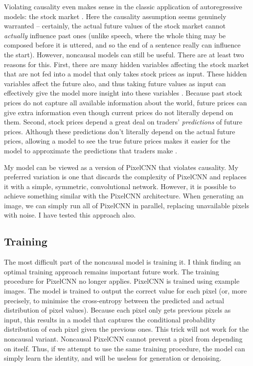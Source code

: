 \documentclass[10pt,a4paper]{article}
\begin{document}
Violating causality even makes sense in the classic application of autoregressive models: the stock market \citep{noncausaleco1}. Here the causality assumption seems genuinely warranted -- certainly, the actual future values of the stock market cannot \emph{actually} influence past ones (unlike speech, where the whole thing may be composed before it is uttered, and so the end of a sentence really can influence the start). However, noncausal models can still be useful. There are at least two reasons for this. First, there are many hidden variables affecting the stock market that are not fed into a model that only takes stock prices as input. These hidden variables affect the future also, and thus taking future values as input can effectively give the model more insight into these variables \citep{noncausaleco1}. Because past stock prices do not capture all available information about the world, future prices can give extra information even though current prices do not literally depend on them. Second, stock prices depend a great deal on traders' \emph{predictions} of future prices. Although these predictions don't literally depend on the actual future prices, allowing a model to see the true future prices makes it easier for the model to approximate the predictions that traders make \citep{noncausaleco1}.

My model can be viewed as a version of PixelCNN that violates causality. My preferred variation is one that discards the complexity of PixelCNN and replaces it with a simple, symmetric, convolutional network. However, it is possible to achieve something similar with the PixelCNN architecture. When generating an image, we can simply run all of PixelCNN in parallel, replacing unavailable pixels with noise. I have tested this approach also.

\subsection{Training}

The most difficult part of the noncausal model is training it. I think finding an optimal training approach remains important future work. The training procedure for PixelCNN no longer applies. PixelCNN is trained using example images. The model is trained to output the correct value for each pixel (or, more precisely, to minimise the cross-entropy between the predicted and actual distribution of pixel values). Because each pixel only gets previous pixels as input, this results in a model that captures the conditional probability distribution of each pixel given the previous ones. This trick will not work for the noncausal variant. Noncausal PixelCNN cannot prevent a pixel from depending on itself. Thus, if we attempt to use the same training procedure, the model can simply learn the identity, and will be useless for generation or denoising.
\end{document}
